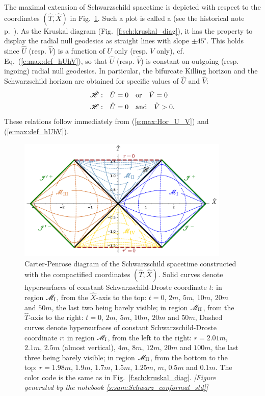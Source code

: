 The maximal extension of Schwarzschild spacetime is depicted with respect
to the coordinates $(\hat{T},\hat{X})$ in Fig.~\ref{f:max:carter-penrose-std}.
Such a plot is called a 
(see the historical note p.~\pageref{h:max:CP-diag}).
As the Kruskal diagram (Fig.~\ref{f:sch:kruskal_diag}), it has the property
to display the radial null geodesics as straight lines with slope $\pm 45^\circ$.
This holds
since $\hat{U}$ (resp. $\hat{V}$) is a function of $U$ only
(resp. $V$ only), cf. Eq.~(\ref{e:max:def_hUhV}), so that $\hat{U}$
(resp. $\hat{V}$) is constant on outgoing (resp. ingoing) radial null geodesics.
In particular, the bifurcate Killing horizon and the Schwarzschild horizon
are obtained for specific values of $\hat{U}$ and $\hat{V}$:
\begin{subequations}
\begin{align}
    \hat{\mathscr{H}}:\quad&  \hat{U} = 0 \quad\mbox{or}\quad \hat{V} = 0 \\
    \mathscr{H}:\quad &  \hat{U} = 0 \quad\mbox{and}\quad \hat{V} > 0 .
\end{align}
\end{subequations}
These relations follow immediately from (\ref{e:max:Hor_U_V}) and
(\ref{e:max:def_hUhV}).


\begin{figure}
\centerline{\includegraphics[width=0.9\textwidth]{max_carter-penrose-std.pdf}}
\caption[]{\label{f:max:carter-penrose-std} \footnotesize
Carter-Penrose diagram of the Schwarzschild spacetime
constructed with the compactified coordinates $(\hat{T},\hat{X})$.
Solid curves denote hypersurfaces of constant Schwarzschild-Droste coordinate
$t$: in region $\mathscr{M}_{\rm I}$, from the $\hat{X}$-axis to the top: $t=0$, $2m$,
$5m$, $10m$, $20m$ and $50m$, the last two being barely visible;
in region $\mathscr{M}_{\rm II}$, from the $\hat{T}$-axis
to the right: $t=0$, $2m$, $5m$, $10m$, $20m$ and $50m$,
Dashed curves denote hypersurfaces of constant Schwarzschild-Droste coordinate
$r$: in region $\mathscr{M}_{\rm I}$, from the left to the right: $r=2.01m$, $2.1m$, $2.5m$ (almost vertical), $4m$, $8m$, $12m$, $20m$ and $100m$, the last three being barely visible;
in region $\mathscr{M}_{\rm II}$, from the bottom to the top: $r=1.98m$, $1.9m$, $1.7m$,
$1.5m$, $1.25m$, $m$, $0.5m$ and $0.1m$.
The color code is the same as in Fig.~\ref{f:sch:kruskal_diag}.
\textsl{[Figure generated by the notebook \ref{s:sam:Schwarz_conformal_std}]}
}
\end{figure}


